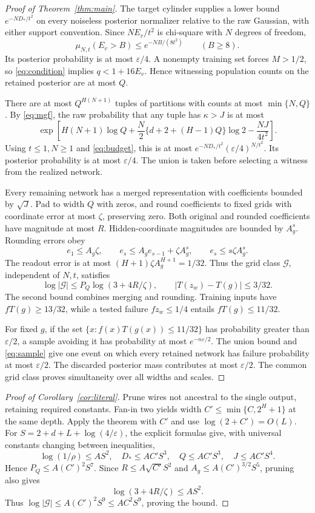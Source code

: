 \documentclass[11pt]{article}
\begin{document}
\begin{proof}[Proof of Theorem~\ref{thm:main}]
The target cylinder supplies a lower bound $e^{-ND_*/t^2}$ on every noiseless posterior normalizer relative to the raw Gaussian, with either support convention. Since $NE_v/t^2$ is chi-square with $N$ degrees of freedom,
\[
 \mu_{N,t}(E_v>B)\le e^{-NB/(8t^2)}\qquad(B\ge8).
\]
Its posterior probability is at most $\varepsilon/4$. A nonempty training set forces $M>1/2$, so \eqref{eq:condition} implies $q<1+16E_v$. Hence witnessing population counts on the retained posterior are at most $Q$.

There are at most $Q^{H(N+1)}$ tuples of partitions with counts at most $\min\{N,Q\}$. By \eqref{eq:mgf}, the raw probability that any tuple has $\kappa>J$ is at most
\[
 \exp\left[H(N+1)\log Q+\frac N2\{d+2+(H-1)Q\}\log2-\frac{NJ}{4t^2}\right].
\]
Using $t\le1,N\ge1$ and \eqref{eq:budget}, this is at most
$e^{-ND_*/t^2}(\varepsilon/4)^{N/t^2}$. Its posterior probability is at most $\varepsilon/4$. The union is taken before selecting a witness from the realized network.

Every remaining network has a merged representation with coefficients bounded by $\sqrt J$. Pad to width $Q$ with zeros, and round coefficients to fixed grids with coordinate error at most $\zeta$, preserving zero. Both original and rounded coefficients have magnitude at most $R$. Hidden-coordinate magnitudes are bounded by $A_g^s$. Rounding errors obey
\[
 e_1\le A_g\zeta,\qquad e_s\le A_ge_{s-1}+\zeta A_g^s,
 \qquad e_s\le s\zeta A_g^s.
\]
The readout error is at most $(H+1)\zeta A_g^{H+1}=1/32$. Thus the grid class $\mathcal G$, independent of $N,t$, satisfies
\[
 \log|\mathcal G|\le P_Q\log(3+4R/\zeta),\qquad
 |T(z_w)-T(g)|\le3/32.
\]
The second bound combines merging and rounding. Training inputs have $fT(g)\ge13/32$, while a tested failure $fz_w\le1/4$ entails $fT(g)\le11/32$.

For fixed $g$, if the set $\{x:f(x)T(g(x))\le11/32\}$ has probability greater than $\varepsilon/2$, a sample avoiding it has probability at most $e^{-n\varepsilon/2}$. The union bound and \eqref{eq:sample} give one event on which every retained network has failure probability at most $\varepsilon/2$. The discarded posterior mass contributes at most $\varepsilon/2$. The common grid class proves simultaneity over all widths and scales.
\end{proof}

\begin{proof}[Proof of Corollary~\ref{cor:literal}]
Prune wires not ancestral to the single output, retaining required constants. Fan-in two yields width $C'\le\min\{C,2^H+1\}$ at the same depth. Apply the theorem with $C'$ and use $\log(2+C')=O(L)$. For $S=2+d+L+\log(4/\varepsilon)$, the explicit formulas give, with universal constants changing between inequalities,
\[
 \log(1/\rho)\le AS^2,\quad D_*\le AC'S^3,\quad
 Q\le AC'S^3,\quad J\le AC'S^4.
\]
Hence $P_Q\le A(C')^2S^7$. Since $R\le A\sqrt{C'}S^2$ and $A_g\le A(C')^{3/2}S^5$, pruning also gives
\[
 \log(3+4R/\zeta)\le AS^2.
\]
Thus $\log|\mathcal G|\le A(C')^2S^9\le AC^2S^9$, proving the bound.
\end{proof}
\end{document}
